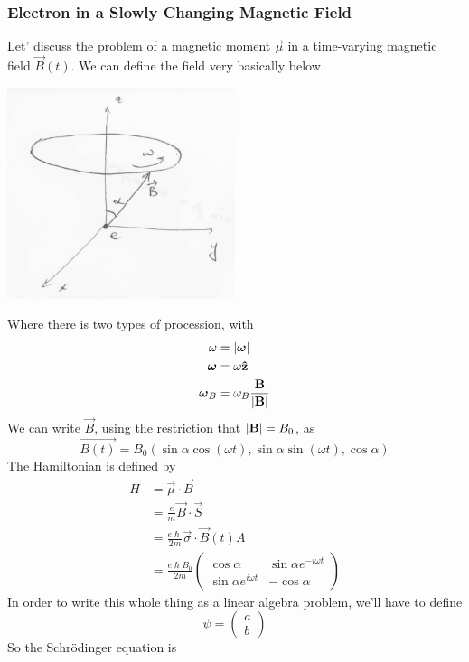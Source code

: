 \documentclass[a4paper]{article}
\begin{document}
\subsubsection{Electron in a Slowly Changing Magnetic Field}
Let' discuss the problem of a magnetic moment $\vec{\mu}$ in a time-varying
magnetic field $\vec{B}(t)$.
We can define the field very basically below
\begin{center}
	\includegraphics[width=0.5\textwidth]{BerrysField.png}
\end{center}
Where there is two types of procession, with
\begin{align*}
	\omega &= \left\lvert \boldsymbol{\mathbf{\omega}}\right\rvert\\
	\boldsymbol{\mathbf{\omega}} &= \omega\boldsymbol{\mathbf{\hat{z}}}\\
	\boldsymbol{\mathbf{\omega}}_B &= \omega_B\frac{\boldsymbol{\mathbf{B}}}{\left\lvert \boldsymbol{\mathbf{B}}\right\rvert}
\end{align*}
We can write $\vec{B}$, using the restriction that $\left\lvert \boldsymbol{\mathbf{B}}\right\rvert = B_0$, as
\[
	\vec{B(t)} = B_0 \left( \sin\alpha\cos(\omega t), \sin\alpha\sin(\omega
	t), \cos\alpha \right)
\]
The Hamiltonian is defined by
\begin{align*}
	H &= \vec{\mu}\cdot\vec{B}\\
	&= \frac{e}{m}\vec{B}\cdot\vec{S}\\
	&= \frac{e\hslash}{2m}\vec{\sigma}\cdot\vec{B}(t)A\\
	&= \frac{e\hslash B_0}{2m}\begin{pmatrix}
		\cos\alpha & \sin\alpha e^{-i\omega t}\\
		\sin\alpha e^{i\omega t} & -\cos\alpha
	\end{pmatrix}
\end{align*}
In order to write this whole thing as a linear algebra problem, we'll have to
define
\[
	\psi = \begin{pmatrix} a\\b \end{pmatrix}
\]
So the Schr\"odinger equation is
\end{document}
